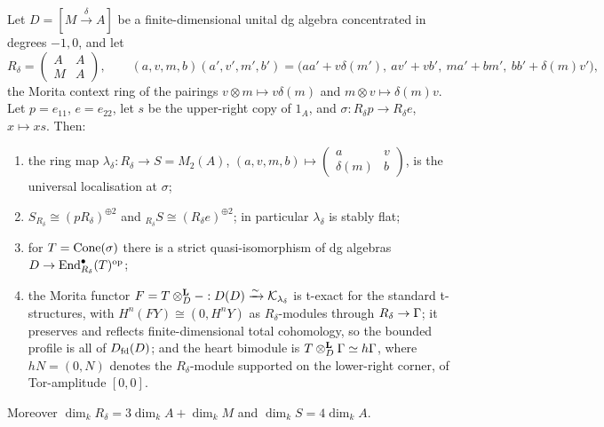 \begin{theorem}\label{thm:realisation}
Let \(D=[M\xrightarrow{\delta}A]\) be a finite-dimensional unital dg algebra concentrated in degrees \(-1,0\), and let
\begin{equation}\label{eq:R-delta}
 R_\delta=\begin{pmatrix}A&A\\M&A\end{pmatrix},
 \qquad
 (a,v,m,b)(a',v',m',b')=\bigl(aa'+v\delta(m'),\ av'+vb',\ ma'+bm',\ bb'+\delta(m)v'\bigr),
\end{equation}
the Morita context ring of the pairings \(v\otimes m\mapsto v\delta(m)\) and \(m\otimes v\mapsto\delta(m)v\).  Let \(p=e_{11}\), \(e=e_{22}\), let \(s\) be the upper-right copy of \(1_A\), and \(\sigma:R_\delta p\to R_\delta e\), \(x\mapsto xs\).  Then:
\begin{enumerate}[label=\textup{(\roman*)}]
\item\label{re:i} the ring map \(\lambda_\delta:R_\delta\to S=M_2(A)\), \((a,v,m,b)\mapsto\begin{pmatrix}a&v\\\delta(m)&b\end{pmatrix}\), is the universal localisation at \(\sigma\);
\item\label{re:ii} \(S_{R_\delta}\cong(pR_\delta)^{\oplus2}\) and \({}_{R_\delta}S\cong(R_\delta e)^{\oplus2}\); in particular \(\lambda_\delta\) is stably flat;
\item\label{re:iii} for \(T=\operatorname{Cone}(\sigma)\) there is a strict quasi-isomorphism of dg algebras \(D\to\operatorname{End}^\bullet_{R_\delta}(T)^{\mathrm{op}}\);
\item\label{re:iv} the Morita functor \(F=T\otimes^{\mathbf L}_D-:D(D)\xrightarrow{\sim}\mathcal K_{\lambda_\delta}\) is t-exact for the standard t-structures, with \(H^n(FY)\cong(0,H^nY)\) as \(R_\delta\)-modules through \(R_\delta\to\Gamma\); it preserves and reflects finite-dimensional total cohomology, so the bounded profile is all of \(D_{\mathrm{fd}}(D)\); and the heart bimodule is \(T\otimes^{\mathbf L}_D\Gamma\simeq h\Gamma\), where \(hN=(0,N)\) denotes the \(R_\delta\)-module supported on the lower-right corner, of Tor-amplitude \([0,0]\).
\end{enumerate}
Moreover \(\dim_kR_\delta=3\dim_kA+\dim_kM\) and \(\dim_kS=4\dim_kA\).
\end{theorem}

